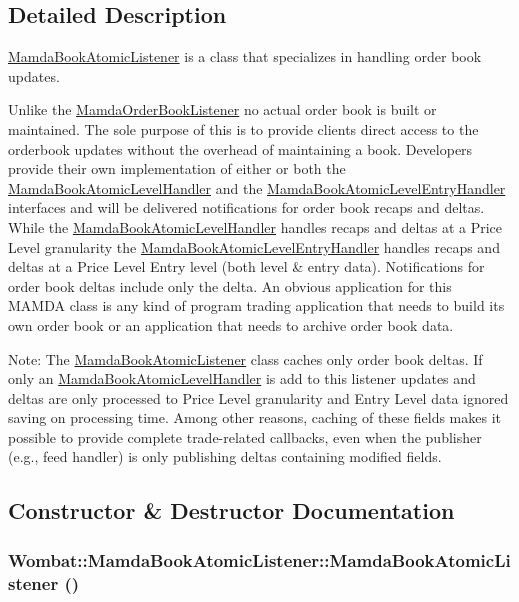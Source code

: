\subsection{Detailed Description}
\hyperlink{classWombat_1_1MamdaBookAtomicListener}{Mamda\-Book\-Atomic\-Listener} is a class that specializes in handling order book updates. 

Unlike the \hyperlink{classWombat_1_1MamdaOrderBookListener}{Mamda\-Order\-Book\-Listener} no actual order book is built or maintained. The sole purpose of this is to provide clients direct access to the orderbook updates without the overhead of maintaining a book. Developers provide their own implementation of either or both the \hyperlink{classWombat_1_1MamdaBookAtomicLevelHandler}{Mamda\-Book\-Atomic\-Level\-Handler} and the \hyperlink{classWombat_1_1MamdaBookAtomicLevelEntryHandler}{Mamda\-Book\-Atomic\-Level\-Entry\-Handler} interfaces and will be delivered notifications for order book recaps and deltas. While the \hyperlink{classWombat_1_1MamdaBookAtomicLevelHandler}{Mamda\-Book\-Atomic\-Level\-Handler} handles recaps and deltas at a Price Level granularity the \hyperlink{classWombat_1_1MamdaBookAtomicLevelEntryHandler}{Mamda\-Book\-Atomic\-Level\-Entry\-Handler} handles recaps and deltas at a Price Level Entry level (both level \& entry data). Notifications for order book deltas include only the delta. An obvious application for this MAMDA class is any kind of program trading application that needs to build its own order book or an application that needs to archive order book data.

Note: The \hyperlink{classWombat_1_1MamdaBookAtomicListener}{Mamda\-Book\-Atomic\-Listener} class caches only order book deltas. If only an \hyperlink{classWombat_1_1MamdaBookAtomicLevelHandler}{Mamda\-Book\-Atomic\-Level\-Handler} is add to this listener updates and deltas are only processed to Price Level granularity and Entry Level data ignored saving on processing time. Among other reasons, caching of these fields makes it possible to provide complete trade-related callbacks, even when the publisher (e.g., feed handler) is only publishing deltas containing modified fields. 



\subsection{Constructor \& Destructor Documentation}
\hypertarget{classWombat_1_1MamdaBookAtomicListener_63f5ebdd93ecd7cad9c07af399508aec}{
\subsubsection[MamdaBookAtomicListener]{\setlength{\rightskip}{0pt plus 5cm}Wombat::Mamda\-Book\-Atomic\-Listener::Mamda\-Book\-Atomic\-Listener ()}}
\label{classWombat_1_1MamdaBookAtomicListener_63f5ebdd93ecd7cad9c07af399508aec}


